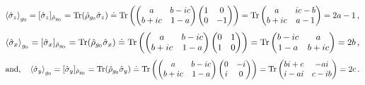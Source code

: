 \documentclass[11pt]{article}
\numberwithin{equation}{section} %
\numberwithin{figure}{section} %
\begin{document}
\begin{equation} \label{sigma_z}
\braket{\hat{\sigma}_z}_{g_0}=[\hat{\sigma}_z]_{\hat{\rho}_{g_0}}=\textrm{Tr}(\hat{\rho}_{g_0}\hat{\sigma}_z)\doteq \textrm{Tr}\begin{pmatrix}\begin{pmatrix}a&b-ic\\b+ic&1-a\end{pmatrix}\begin{pmatrix}1&0\\0&-1\end{pmatrix}\end{pmatrix}=\textrm{Tr}\begin{pmatrix}a&ic-b\\b+ic&a-1\end{pmatrix}=2a-1\,\textrm{,}
\end{equation}
\begin{equation} \label{sigma_x}
\braket{\hat{\sigma}_x}_{g_0}=[\hat{\sigma}_x]_{\hat{\rho}_{g_0}}=\textrm{Tr}(\hat{\rho}_{g_0}\hat{\sigma}_x)\doteq \textrm{Tr}\begin{pmatrix}\begin{pmatrix}a&b-ic\\b+ic&1-a\end{pmatrix}\begin{pmatrix}0&1\\1&0\end{pmatrix}\end{pmatrix}=\textrm{Tr}\begin{pmatrix}b-ic&a\\1-a&b+ic\end{pmatrix}=2b\,\textrm{,}
\end{equation}
\begin{equation} \label{sigma_y}
\textrm{and,}\quad\braket{\hat{\sigma}_y}_{g_0}=[\hat{\sigma}_y]_{\hat{\rho}_{g_0}}=\textrm{Tr}(\hat{\rho}_{g_0}\hat{\sigma}_y)\doteq \textrm{Tr}\begin{pmatrix}\begin{pmatrix}a&b-ic\\b+ic&1-a\end{pmatrix}\begin{pmatrix}0&-i\\i&0\end{pmatrix}\end{pmatrix}=\textrm{Tr}\begin{pmatrix}bi+c&-ai\\i-ai&c-ib\end{pmatrix}=2c\,\textrm{.}
\end{equation}
\end{document}
